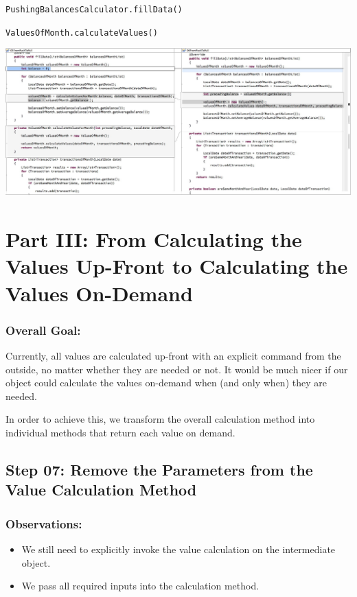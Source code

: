 \documentclass[a4paper,fleqn,titlepage,11pt]{article}
\begin{document}
\texttt{PushingBalancesCalculator.fillData()}

\texttt{ValuesOfMonth.calculateValues()}

\includegraphics[width=1\textwidth]{CompareViews/05-06.jpg}


\section*{Part III: From Calculating the Values Up-Front to Calculating the Values On-Demand}

\subsubsection*{Overall Goal:}

Currently, all values are calculated up-front with an explicit command from the outside, no matter whether they are needed or not. It would be much nicer if our object could calculate the values on-demand when (and only when) they are needed.

In order to achieve this, we transform the overall calculation method into individual methods that return each value on demand.

\subsection*{Step 07: Remove the Parameters from the Value Calculation Method}

\subsubsection*{Observations:}
\begin{itemize}
\item We still need to explicitly invoke the value calculation on the intermediate object. 
\item We pass all required inputs into the calculation method.
\end{itemize}
\end{document}
